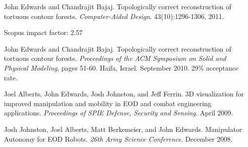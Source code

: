 \documentclass[margin,line]{res}
\newcommand{\pubunder}[1]{#1}
\begin{document}
\begin{resume}
\protect \pubunder{John Edwards} and Chandrajit Bajaj. Topologically correct reconstruction of tortuous contour forests. \textit{Computer-Aided Design}. 43(10):1296-1306, 2011.
\begin{IMPACT}
Scopus impact factor: 2.57 %
\end{IMPACT}

\pubunder{John Edwards} and Chandrajit Bajaj. Topologically correct reconstruction of tortuous contour forests. \textit{Proceedings of the ACM Symposium on Solid and Physical Modeling}, pages 51-60. Haifa, Israel. September 2010. 29\% acceptance rate.

Joel Alberts, \pubunder{John Edwards}, Josh Johnston, and Jeff Ferrin. 3D visualization for improved manipulation and mobility in EOD and combat engineering applications. \textit{Proceedings of SPIE Defense, Security and Sensing}. April 2009.

Josh Johnston, Joel Alberts, Matt Berkemeier, and \pubunder{John Edwards}. Manipulator Autonomy for EOD Robots. \textit{26th Army Science Conference}. December 2008.

\begin{IMPACT}
\end{IMPACT}







\end{resume}
\end{document}
